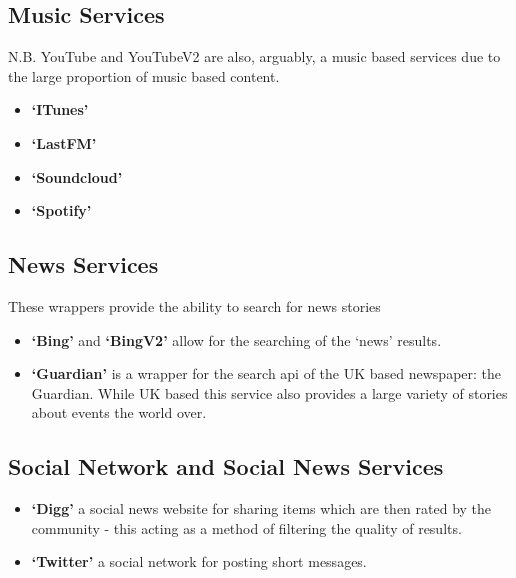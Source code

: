 \documentclass[letterpaper,10pt,english]{sphinxmanual}
\begin{document}
\subsection{Music Services}
\label{wrappers:music-services}
N.B. YouTube and YouTubeV2 are also, arguably, a music based services due to the large proportion of music based content.
\begin{itemize}
\item {} 
\textbf{`ITunes'}

\item {} 
\textbf{`LastFM'}

\item {} 
\textbf{`Soundcloud'}

\item {} 
\textbf{`Spotify'}

\end{itemize}


\subsection{News Services}
\label{wrappers:news-services}
These wrappers provide the ability to search for news stories
\begin{itemize}
\item {} 
\textbf{`Bing'} and \textbf{`BingV2'} allow for the searching of the `news' results.

\item {} 
\textbf{`Guardian'} is a wrapper for the search api of the UK based newspaper: the Guardian. While UK based this service also provides a large variety of stories about events the world over.

\end{itemize}


\subsection{Social Network and Social News Services}
\label{wrappers:social-network-and-social-news-services}\begin{itemize}
\item {} 
\textbf{`Digg'} a social news website for sharing items which are then rated by the community - this acting as a method of filtering the quality of results.

\item {} 
\textbf{`Twitter'} a social network for posting short messages.

\end{itemize}
\end{document}
